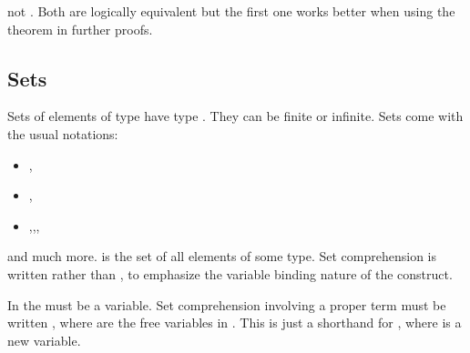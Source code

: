 \begin{isabellebody}
\begin{isamarkuptext}
\begin{warn}
not . Both are logically equivalent
but the first one works better when using the theorem in further proofs.
\end{warn}

\subsection{Sets}

Sets of elements of type  have type .
They can be finite or infinite. Sets come with the usual notations:
\begin{itemize}
\item {},\quad {}
\item {},\quad {}
\item {},\quad {},\quad {},\quad {}
\end{itemize}
and much more.  is the set of all elements of some type.
Set comprehension is written 
rather than , to emphasize the variable binding nature
of the construct.
\begin{warn}
In  the  must be a variable. Set comprehension
involving a proper term  must be written
,
where  are the free variables in .
This is just a shorthand for , where
 is a new variable.
\end{warn}


\end{isamarkuptext}
\end{isabellebody}
